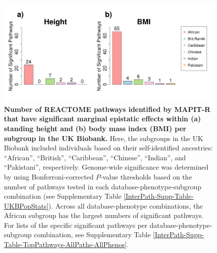 \documentclass[10pt]{article}
\begin{document}
\begin{figure}[htbp]
\centering
\includegraphics[width = \textwidth]{Images/Supp/InterPath_Supp_Figure_Barplots_REACTOME_vs4.png}
\caption{\textbf{Number of REACTOME pathways identified by MAPIT-R that have significant marginal epistatic effects within (a) standing height and (b) body mass index (BMI) per subgroup in the UK Biobank.} Here, the subgroups in the UK Biobank included individuals based on their self-identified ancestries: ``African'', ``British'', ``Caribbean'', ``Chinese'', ``Indian'', and ``Pakistani'', respectively. Genome-wide significance was determined by using Bonferroni-corrected $P$-value thresholds based on the number of pathways tested in each database-phenotype-subgroup combination (see Supplementary Table \ref{InterPath-Supp-Table-UKBPopStats}). Across all database-phenotype combinations, the African subgroup has the largest numbers of significant pathways. For lists of the specific significant pathways per database-phenotype-subgroup combination, see Supplementary Table \ref{InterPath-Supp-Table-TopPathways-AllPaths-AllPhenos}.}
\label{InterPath-Supp-Figure-Barplots-REACTOME}
\end{figure}
\clearpage
\end{document}

